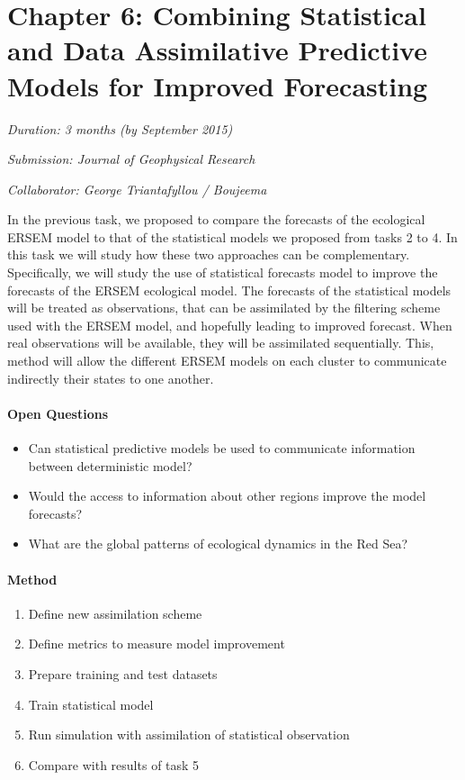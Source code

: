 \section{Chapter 6: Combining Statistical and Data Assimilative Predictive Models for Improved Forecasting}

\noindent
\emph{Duration: 3 months (by September 2015)}

\noindent
\emph{Submission: Journal of Geophysical Research}

\noindent
\emph{Collaborator: George Triantafyllou / Boujeema}

In the previous task, we proposed to compare the forecasts of the ecological ERSEM model to that of the statistical models we proposed from tasks 2 to 4. In this task we will study how these two approaches can be complementary. Specifically, we will study the use of statistical forecasts model to improve the forecasts of the ERSEM ecological model. The forecasts of the statistical models will be treated as observations, that can be assimilated by the filtering scheme used with the ERSEM model, and hopefully leading to improved forecast. When real observations will be available, they will be assimilated sequentially. This, method will allow the different ERSEM models on each cluster to communicate indirectly their states to one another. 

\paragraph{Open Questions}

\begin{itemize}
  \item Can statistical predictive models be used to communicate information between deterministic model?
  \item Would the access to information about other regions improve the model forecasts?
  \item What are the global patterns of ecological dynamics in the Red Sea?
\end{itemize}

\paragraph{Method}

\begin{enumerate}
  \item Define new assimilation scheme
  \item Define metrics to measure model improvement
  \item Prepare training and test datasets
  \item Train statistical model
  \item Run simulation with assimilation of statistical observation
  \item Compare with results of task 5
\end{enumerate}

